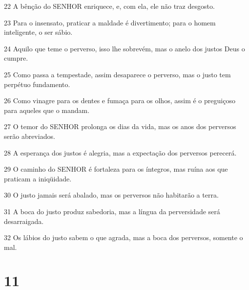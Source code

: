 \par 22 A bênção do SENHOR enriquece, e, com ela, ele não traz desgosto.
\par 23 Para o insensato, praticar a maldade é divertimento; para o homem inteligente, o ser sábio.
\par 24 Aquilo que teme o perverso, isso lhe sobrevém, mas o anelo dos justos Deus o cumpre.
\par 25 Como passa a tempestade, assim desaparece o perverso, mas o justo tem perpétuo fundamento.
\par 26 Como vinagre para os dentes e fumaça para os olhos, assim é o preguiçoso para aqueles que o mandam.
\par 27 O temor do SENHOR prolonga os dias da vida, mas os anos dos perversos serão abreviados.
\par 28 A esperança dos justos é alegria, mas a expectação dos perversos perecerá.
\par 29 O caminho do SENHOR é fortaleza para os íntegros, mas ruína aos que praticam a iniqüidade.
\par 30 O justo jamais será abalado, mas os perversos não habitarão a terra.
\par 31 A boca do justo produz sabedoria, mas a língua da perversidade será desarraigada.
\par 32 Os lábios do justo sabem o que agrada, mas a boca dos perversos, somente o mal.

\chapter{11}

